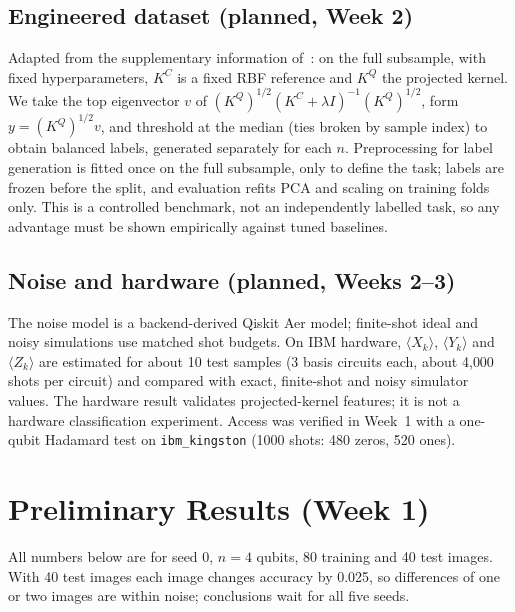 \documentclass[conference]{IEEEtran}
\begin{document}
\subsection{Engineered dataset (planned, Week 2)}
Adapted from the supplementary information of~\cite{huang2021}: on the full subsample, with fixed hyperparameters, $K^{C}$ is a fixed RBF reference and $K^{Q}$ the projected kernel. We take the top eigenvector $v$ of $(K^{Q})^{1/2}(K^{C}+\lambda I)^{-1}(K^{Q})^{1/2}$, form $y=(K^{Q})^{1/2}v$, and threshold at the median (ties broken by sample index) to obtain balanced labels, generated separately for each $n$. Preprocessing for label generation is fitted once on the full subsample, only to define the task; labels are frozen before the split, and evaluation refits PCA and scaling on training folds only. This is a controlled benchmark, not an independently labelled task, so any advantage must be shown empirically against tuned baselines.

\subsection{Noise and hardware (planned, Weeks 2--3)}
The noise model is a backend-derived Qiskit Aer model; finite-shot ideal and noisy simulations use matched shot budgets. On IBM hardware, $\langle X_k\rangle$, $\langle Y_k\rangle$ and $\langle Z_k\rangle$ are estimated for about 10 test samples (3 basis circuits each, about 4{,}000 shots per circuit) and compared with exact, finite-shot and noisy simulator values. The hardware result validates projected-kernel features; it is not a hardware classification experiment. Access was verified in Week~1 with a one-qubit Hadamard test on \texttt{ibm\_kingston} (1000 shots: 480 zeros, 520 ones).

\section{Preliminary Results (Week 1)}
All numbers below are for seed 0, $n=4$ qubits, 80 training and 40 test images. With 40 test images each image changes accuracy by 0.025, so differences of one or two images are within noise; conclusions wait for all five seeds.
\end{document}
